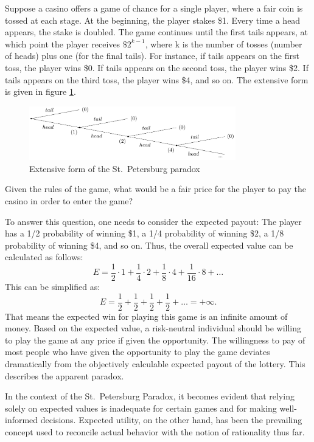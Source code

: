 \documentclass[
  12pt,
  oneside]{book}
\theoremstyle{definition}
\theoremstyle{definition}
\theoremstyle{definition}
\theoremstyle{definition}
\theoremstyle{remark}
\begin{document}
Suppose a casino offers a game of chance for a single player, where a fair coin is tossed at each stage. At the beginning, the player stakes \$1. Every time a head appears, the stake is doubled. The game continues until the first tails appears, at which point the player receives \(\$ 2^{k-1}\), where k is the number of tosses (number of heads) plus one (for the final tails).
For instance, if tails appears on the first toss, the player wins \$0. If tails appears on the second toss, the player wins \$2. If tails appears on the third toss, the player wins \$4, and so on. The extensive form is given in figure \ref{fig:spextensiveform}.

\begin{figure}
\centering
\includegraphics[width=0.8\textwidth,height=\textheight]{fig/spextensiveform.png}
\caption{\label{fig:spextensiveform} Extensive form of the St.~Petersburg paradox}
\end{figure}

Given the rules of the game, what would be a fair price for the player to pay the casino in order to enter the game?

To answer this question, one needs to consider the expected payout: The player has a 1/2 probability of winning \$1, a 1/4 probability of winning \$2, a 1/8 probability of winning \$4, and so on. Thus, the overall expected value can be calculated as follows:
\[
E = \frac{1}{2} \cdot 1 + \frac{1}{4} \cdot 2 + \frac{1}{8} \cdot 4+ \frac{1}{16} \cdot 8 + \dots 
\]
This can be simplified as:
\[
E = \frac{1}{2} + \frac{1}{2} + \frac{1}{2} + \frac{1}{2} + \dots = + \infty.
\]
That means the expected win for playing this game is an infinite amount of money. Based on the expected value, a risk-neutral individual should be willing to play the game at any price if given the opportunity.
The willingness to pay of most people who have given the opportunity to play the game deviates dramatically from the objectively calculable expected payout of the lottery. This describes the apparent paradox.

In the context of the St.~Petersburg Paradox, it becomes evident that relying solely on expected values is inadequate for certain games and for making well-informed decisions. Expected utility, on the other hand, has been the prevailing concept used to reconcile actual behavior with the notion of rationality thus far.
\end{document}
